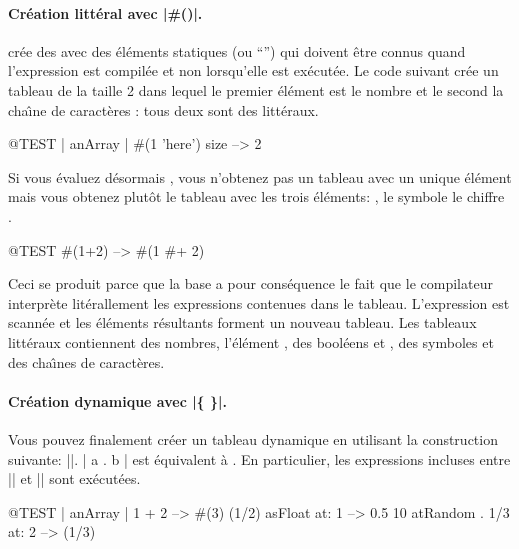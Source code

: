 \documentclass[a4paper,10pt,twoside]{book}
\begin{document}
\paragraph{Cr\'eation litt\'eral avec \ct|\#()|.}
\ct{#()} cr\'ee des  avec des \'el\'ements
statiques (ou ``'') qui doivent \^etre connus
quand l'expression est compil\'ee et non lorsqu'elle est ex\'ecut\'ee.
Le code suivant cr\'ee un tableau de la taille 2
dans lequel le premier \'el\'ement est le nombre 
et le second la cha\^{\i}ne de caract\`eres : tous deux sont des litt\'eraux.


\begin{code}{@TEST | anArray |}
#(1 'here') size --> 2
\end{code}

Si vous \'evaluez d\'esormais , vous n'obtenez pas un tableau
avec un unique \'el\'ement  mais vous obtenez plut\^ot le tableau
 \ie avec les trois \'el\'ements: , le symbole
\ct{#+} le chiffre .

\begin{code}{@TEST}
#(1+2) -->  #(1 #+ 2)
\end{code}

\noindent
Ceci se produit parce que la base \ct{#()} a pour cons\'equence le fait que
le compilateur interpr\`ete lit\'erallement les expressions contenues dans
le tableau. L'expression est scann\'ee et les \'el\'ements r\'esultants
forment un nouveau tableau. Les tableaux litt\'eraux contiennent des
nombres, l'\'el\'ement , des bool\'eens  et ,
des symboles et des cha\^{\i}nes de caract\`eres.

\paragraph{Cr\'eation dynamique avec \ct|\{ \}|.}
Vous pouvez finalement cr\'eer un tableau dynamique en utilisant
la construction suivante: \ct|{}|. \ct|{ a . b }| est \'equivalent
\`a . En particulier, les expressions incluses
entre \ct|{| et \ct|}| sont ex\'ecut\'ees. 

\begin{code}{@TEST | anArray |}
{ 1 + 2 } --> #(3)
{(1/2) asFloat} at: 1 --> 0.5
{10 atRandom . 1/3} at: 2 --> (1/3)
\end{code}
\end{document}
